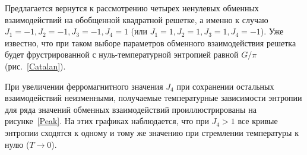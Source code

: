 \documentclass[utf8,12pt]{jetp}
\begin{document}
Предлагается вернутся к рассмотрению четырех ненулевых обменных взаимодействий на обобщенной квадратной решетке, а именно к случаю $J_1 = -1, J_2 = -1, J_3 = -1, J_4 = 1$ (или $J_1 = 1, J_2 = 1, J_3 = 1, J_4 = -1$). Уже известно, что при таком выборе параметров обменного взаимодействия решетка будет фрустрированной с нуль-температурной энтропией равной $G/\pi$ (рис.~\ref{Catalan}). 

При увеличении ферромагнитного значения $J_4$ при сохранении остальных взаимодействий неизменными, получаемые температурные зависимости энтропии для ряда значений обменных взаимодействий проиллюстрированы на рисунке~\ref{Peak}. На этих графиках наблюдается, что при $J_4>1$ все кривые энтропии сходятся к одному и тому же значению при стремлении температуры к нулю ($T \rightarrow 0$). 

\begin{figure}[h]
	\begin{minipage}[h]{0.5\linewidth}
	\end{minipage}
	\hfill
	\begin{minipage}[h]{0.5\linewidth}

\end{minipage}
\end{figure}
\end{document}
